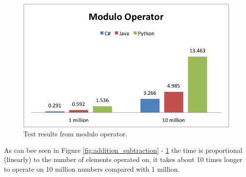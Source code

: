 \begin{figure}[h]
	\centering
	\includegraphics[width=0.48\linewidth]{chapters/media/modulo.png}
	\caption{Test results from modulo operator.}
	\label{fig:modulo}
\end{figure}

As can bee seen in Figure \ref{fig:addition_subtraction} - \ref{fig:modulo} the time is proportional (linearly) to the number of elements operated on, it takes about 10 times longer to operate on 10 million numbers compared with 1 million.  
